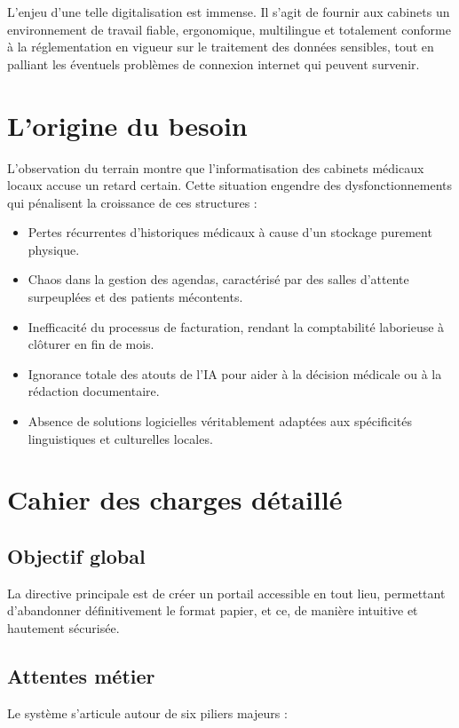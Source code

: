 \documentclass[final]{report}
\begin{document}
L'enjeu d'une telle digitalisation est immense. Il s'agit de fournir aux cabinets un environnement de travail fiable, ergonomique, multilingue et totalement conforme à la réglementation en vigueur sur le traitement des données sensibles, tout en palliant les éventuels problèmes de connexion internet qui peuvent survenir.
 
\section{L'origine du besoin}
L'observation du terrain montre que l'informatisation des cabinets médicaux locaux accuse un retard certain. Cette situation engendre des dysfonctionnements qui pénalisent la croissance de ces structures :
\begin{itemize}
  \item Pertes récurrentes d'historiques médicaux à cause d'un stockage purement physique.
  \item Chaos dans la gestion des agendas, caractérisé par des salles d'attente surpeuplées et des patients mécontents.
  \item Inefficacité du processus de facturation, rendant la comptabilité laborieuse à clôturer en fin de mois.
  \item Ignorance totale des atouts de l'IA pour aider à la décision médicale ou à la rédaction documentaire.
  \item Absence de solutions logicielles véritablement adaptées aux spécificités linguistiques et culturelles locales.
\end{itemize}
 
\section{Cahier des charges détaillé}
\subsection{Objectif global}
La directive principale est de créer un portail accessible en tout lieu, permettant d'abandonner définitivement le format papier, et ce, de manière intuitive et hautement sécurisée.
 
\subsection{Attentes métier}
Le système s'articule autour de six piliers majeurs :
 
\end{document}
